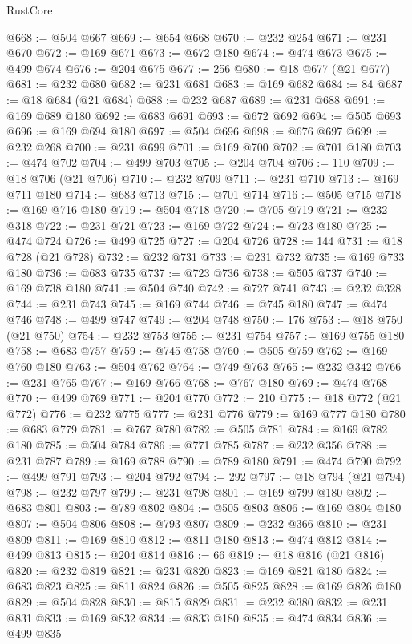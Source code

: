 \begin{lexlean}{RustCore}
\begin{coremodule}
@668 := @504 @667
@669 := @654 @668
@670 := @232 @254
@671 := @231 @670
@672 := @169 @671
@673 := @672 @180
@674 := @474 @673
@675 := @499 @674
@676 := @204 @675
@677 := 256
@680 := @18 @677 (@21 @677)
@681 := @232 @680
@682 := @231 @681
@683 := @169 @682
@684 := 84
@687 := @18 @684 (@21 @684)
@688 := @232 @687
@689 := @231 @688
@691 := @169 @689 @180
@692 := @683 @691
@693 := @672 @692
@694 := @505 @693
@696 := @169 @694 @180
@697 := @504 @696
@698 := @676 @697
@699 := @232 @268
@700 := @231 @699
@701 := @169 @700
@702 := @701 @180
@703 := @474 @702
@704 := @499 @703
@705 := @204 @704
@706 := 110
@709 := @18 @706 (@21 @706)
@710 := @232 @709
@711 := @231 @710
@713 := @169 @711 @180
@714 := @683 @713
@715 := @701 @714
@716 := @505 @715
@718 := @169 @716 @180
@719 := @504 @718
@720 := @705 @719
@721 := @232 @318
@722 := @231 @721
@723 := @169 @722
@724 := @723 @180
@725 := @474 @724
@726 := @499 @725
@727 := @204 @726
@728 := 144
@731 := @18 @728 (@21 @728)
@732 := @232 @731
@733 := @231 @732
@735 := @169 @733 @180
@736 := @683 @735
@737 := @723 @736
@738 := @505 @737
@740 := @169 @738 @180
@741 := @504 @740
@742 := @727 @741
@743 := @232 @328
@744 := @231 @743
@745 := @169 @744
@746 := @745 @180
@747 := @474 @746
@748 := @499 @747
@749 := @204 @748
@750 := 176
@753 := @18 @750 (@21 @750)
@754 := @232 @753
@755 := @231 @754
@757 := @169 @755 @180
@758 := @683 @757
@759 := @745 @758
@760 := @505 @759
@762 := @169 @760 @180
@763 := @504 @762
@764 := @749 @763
@765 := @232 @342
@766 := @231 @765
@767 := @169 @766
@768 := @767 @180
@769 := @474 @768
@770 := @499 @769
@771 := @204 @770
@772 := 210
@775 := @18 @772 (@21 @772)
@776 := @232 @775
@777 := @231 @776
@779 := @169 @777 @180
@780 := @683 @779
@781 := @767 @780
@782 := @505 @781
@784 := @169 @782 @180
@785 := @504 @784
@786 := @771 @785
@787 := @232 @356
@788 := @231 @787
@789 := @169 @788
@790 := @789 @180
@791 := @474 @790
@792 := @499 @791
@793 := @204 @792
@794 := 292
@797 := @18 @794 (@21 @794)
@798 := @232 @797
@799 := @231 @798
@801 := @169 @799 @180
@802 := @683 @801
@803 := @789 @802
@804 := @505 @803
@806 := @169 @804 @180
@807 := @504 @806
@808 := @793 @807
@809 := @232 @366
@810 := @231 @809
@811 := @169 @810
@812 := @811 @180
@813 := @474 @812
@814 := @499 @813
@815 := @204 @814
@816 := 66
@819 := @18 @816 (@21 @816)
@820 := @232 @819
@821 := @231 @820
@823 := @169 @821 @180
@824 := @683 @823
@825 := @811 @824
@826 := @505 @825
@828 := @169 @826 @180
@829 := @504 @828
@830 := @815 @829
@831 := @232 @380
@832 := @231 @831
@833 := @169 @832
@834 := @833 @180
@835 := @474 @834
@836 := @499 @835

\end{coremodule}
\end{lexlean}
